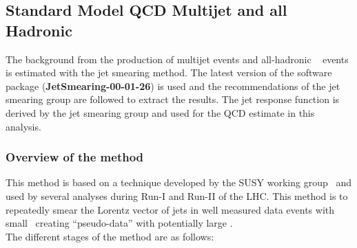 \subsection{Standard Model QCD Multijet and all Hadronic \ttbar}
\label{sec:Bkg:QCD}

The background from the production of multijet events and all-hadronic \ttbar~ events is estimated with the jet smearing method. The latest version of the software package ({\bf  JetSmearing-00-01-26}) is used and the recommendations of the jet smearing group are followed to extract the results. The jet response function is derived by the jet smearing group and used for the QCD estimate in this analysis. \\


\subsubsection{Overview of the method}

This method is based on a technique developed by the SUSY working group~\cite{jetSmearing} and used by several analyses during Run-I and Run-II of the LHC. This
method is to repeatedly smear the Lorentz vector of jets in well measured data events with small \met\ creating ``pseudo-data'' with potentially large \met. \\
The different stages of the method are as follows: \\


